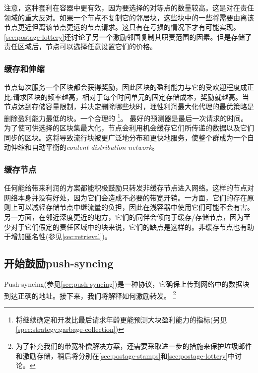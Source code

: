 注意，这种套利在容器中更有效，因为要选择的对等点的数量较高。这是对在责任领域的重大反对。如果一个节点不复制它的邻居块，这些块中的一些将需要由离该节点更近但离该节点更远的节点请求。这只有在亏损的情况下才有可能实现。\ref{sec:postage-lottery}还讨论了另一个激励邻国复制其职责范围的因素。但是存储了责任区域后，节点可以选择任意设置它们的价格。 


\subsubsection{缓存和伸缩}\label{sec:caching}

节点每次服务一个区块都会获得奖励，因此区块的盈利能力与它的受欢迎程度成正比:请求区块的频率越高，相对于每个时间单元的固定存储成本，奖励就越高。当节点达到存储容量限制，并决定删除哪些块时，理性利润最大化代理的最优策略是删除盈利能力最低的块。一个合理的%
%
\footnote{将继续确定和开发比最后请求年龄更能预测大块盈利能力的指标(另见\ref{spec:strategy:garbage-collection})}。
最好的预测器是最后一次请求的时间。为了使可供选择的区块集最大化，节点会利用机会缓存它们所传递的数据以及它们同步的区块。这将导致流行块被更广泛地分布和更快地服务，使整个群成为一个自动伸缩和自动平衡的\emph{content distribution network}。


\subsubsection{缓存节点}

任何能给带来利润的方案都能积极鼓励只转发非缓存节点进入网络。这样的节点对网络本身并没有好处，因为它们会造成不必要的带宽开销。一方面，它们的存在原则上可以减轻存储节点中继流量的负担，因此在浅容器中使用它们可能不会有害。另一方面，在邻近深度更近的地方，它们的同伴会倾向于缓存/存储节点，因为至少对于它们假定的责任区域中的块来说，它们的缺点是这样的。非缓存节点也有助于增加匿名性(参见\ref{sec:retrieval})。

\subsection{开始鼓励push-syncing\statusgreen}\label{sec:push-sync-incentives}

\green{}

Push-syncing(参见\ref{sec:push-syncing})是一种协议，它确保上传到网络中的数据块到达正确的地址。接下来，我们将解释如何激励转发。
%
%
\footnote{为了补充我们的带宽补偿解决方案，还需要采取进一步的措施来保护垃圾邮件和激励存储，稍后将分别在\ref{sec:postage-stamps}和\ref{sec:postage-lottery}中讨论。}



